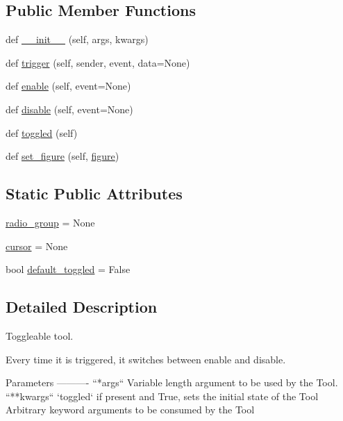 \subsection*{Public Member Functions}
\begin{DoxyCompactItemize}
\item 
def \hyperlink{classmatplotlib_1_1backend__tools_1_1ToolToggleBase_a74d1909130c00077ab3b10a31e343ee9}{\+\_\+\+\_\+init\+\_\+\+\_\+} (self, args, kwargs)
\item 
def \hyperlink{classmatplotlib_1_1backend__tools_1_1ToolToggleBase_a5b136fca854848f9cee863fcb18cafa2}{trigger} (self, sender, event, data=None)
\item 
def \hyperlink{classmatplotlib_1_1backend__tools_1_1ToolToggleBase_a6f4a8940f70797e22c434d4e14fddf71}{enable} (self, event=None)
\item 
def \hyperlink{classmatplotlib_1_1backend__tools_1_1ToolToggleBase_ac018e00d51b5d23618487e35c4e1c4ae}{disable} (self, event=None)
\item 
def \hyperlink{classmatplotlib_1_1backend__tools_1_1ToolToggleBase_a58df03fbbeb455678f8b57a2ed62c6a0}{toggled} (self)
\item 
def \hyperlink{classmatplotlib_1_1backend__tools_1_1ToolToggleBase_aadec6025f331381d975f62c1a47ecc27}{set\+\_\+figure} (self, \hyperlink{classmatplotlib_1_1backend__tools_1_1ToolBase_af85e83d1db0787aa40d06837204651ee}{figure})
\end{DoxyCompactItemize}
\subsection*{Static Public Attributes}
\begin{DoxyCompactItemize}
\item 
\hyperlink{classmatplotlib_1_1backend__tools_1_1ToolToggleBase_a67b662a4cd410ed58c5fa7d82f03d5a1}{radio\+\_\+group} = None
\item 
\hyperlink{classmatplotlib_1_1backend__tools_1_1ToolToggleBase_a366c09bb8c92935f8092e8dced290442}{cursor} = None
\item 
bool \hyperlink{classmatplotlib_1_1backend__tools_1_1ToolToggleBase_aebaf605ed6ca1a5b07b5d66db168544e}{default\+\_\+toggled} = False
\end{DoxyCompactItemize}


\subsection{Detailed Description}
\begin{DoxyVerb}Toggleable tool.

Every time it is triggered, it switches between enable and disable.

Parameters
----------
``*args``
    Variable length argument to be used by the Tool.
``**kwargs``
    `toggled` if present and True, sets the initial state of the Tool
    Arbitrary keyword arguments to be consumed by the Tool
\end{DoxyVerb}
 

